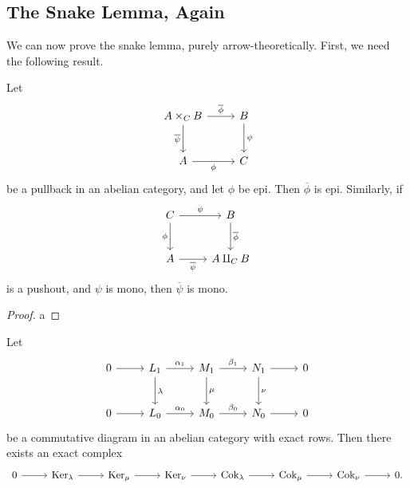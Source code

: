 \subsection{The Snake Lemma, Again}
We can now prove the snake lemma, purely arrow-theoretically. First, we need the following result.
\begin{lemma}\label{lma:9.8}
	Let
	\[\begin{tikzcd}[row sep = 2.5em, column sep = 2.5em]
		A\times _CB\arrow[r, " \overline{\phi } "]\arrow[d, " \overline{\psi } "']&B\arrow[d, "\psi "]\\
		A\arrow[r, "\phi "']&C
	\end{tikzcd}\]
	be a pullback in an abelian category, and let $\phi $ be epi. Then $\overline{\phi } $ is epi. Similarly, if
	\[\begin{tikzcd}[row sep = 2.5em, column sep = 2.5em]
		C\arrow[r, "\psi "]\arrow[d, "\phi "']&B\arrow[d, " \overline{\phi } "]\\
		A\arrow[r, " \overline{\psi } "']&A\amalg_C B
	\end{tikzcd}\]
	is a pushout, and $\psi $ is mono, then $\overline{\psi } $ is mono.
\end{lemma}
\begin{proof}
	a
\end{proof}
\begin{proposition}\label{prp:9.2}
	Let
	\[\begin{tikzcd}[row sep = 2.5em, column sep = 2.5em]
		0\arrow[r]&L_1\arrow[r, "\alpha _1"]\arrow[d, "\lambda "]&M_1\arrow[r, "\beta _1"]\arrow[d, "\mu "]&N_1\arrow[r]\arrow[d, "\nu "]&0\\
		0\arrow[r]&L_0\arrow[r, "\alpha _0"]&M_0\arrow[r, "\beta _0"]&N_0\arrow[r]&0
	\end{tikzcd}\]
	be a commutative diagram in an abelian category with exact rows. Then there exists an exact complex
	\[\begin{tikzcd}[row sep = 2.5em, column sep = 2.5em]
		0\arrow[r]&\operatorname{Ker}_\lambda \arrow[r]&\operatorname{Ker} _\mu \arrow[r]&\operatorname{Ker} _\nu \arrow[r]&\operatorname{Cok}_\lambda \arrow[r]&\operatorname{Cok} _\mu \arrow[r]&\operatorname{Cok} _\nu \arrow[r]&0.
	\end{tikzcd}\]
\end{proposition}

